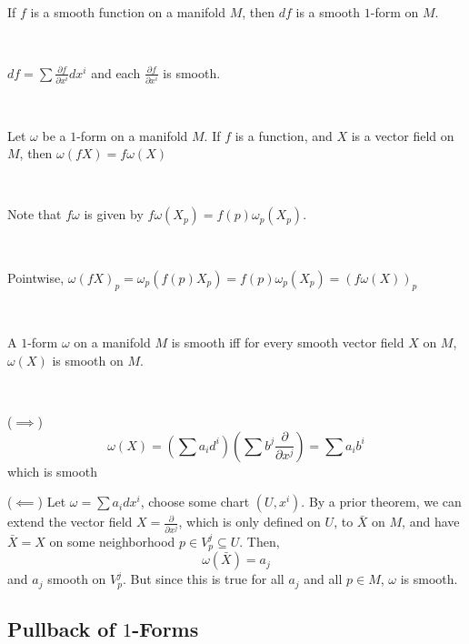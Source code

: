 \documentclass{article}
\begin{document}
\begin{corollary}
  \

  If $f$ is a smooth function on a manifold $M$, then $df$ is a smooth $1$-form on $M$.
\end{corollary}

\begin{customproof}
  \

  $df = \sum \frac{\partial f}{\partial x^i} dx^i$ and each $\frac{\partial f}{\partial x^i}$ is smooth.
\end{customproof}

\begin{proposition}
  \

  Let $\omega$ be a $1$-form on a manifold $M$. If $f$ is a function, and $X$ is a vector field on $M$, then $\omega(fX) = f\omega(X)$
\end{proposition}

\begin{remark}
  \

  Note that $f\omega$ is given by $f\omega(X_p) = f(p)\omega_p(X_p)$.
\end{remark}

\begin{customproof}
  \

  Pointwise, $\omega(fX)_p = \omega_p(f(p)X_p) = f(p)\omega_p(X_p) = (f\omega(X))_p$
\end{customproof}

\begin{proposition}
  \

  A $1$-form $\omega$ on a manifold $M$ is smooth iff for every smooth vector field $X$ on $M$, $\omega(X)$ is smooth on $M$.
\end{proposition}

\begin{customproof}
  \

  ($\implies$) $$\omega(X) = (\sum a_id^i)(\sum b^j\frac{\partial}{\partial x^j}) = \sum a_ib^i$$which is smooth

  ($\impliedby$) Let $\omega = \sum a_idx^i$, choose some chart $(U, x^i)$. By a prior theorem, we can extend the vector field $X = \frac{\partial}{\partial x^j}$, which is only defined on $U$, to $\bar{X}$ on $M$, and have $\bar{X} = X$ on some neighborhood $p \in V_p^j \subseteq U$. Then, $$\omega(\bar{X}) = a_j$$and $a_j$ smooth on $V_p^j$. But since this is true for all $a_j$ and all $p\in M$, $\omega$ is smooth.
\end{customproof}

\subsection{Pullback of $1$-Forms}
\
\end{document}
